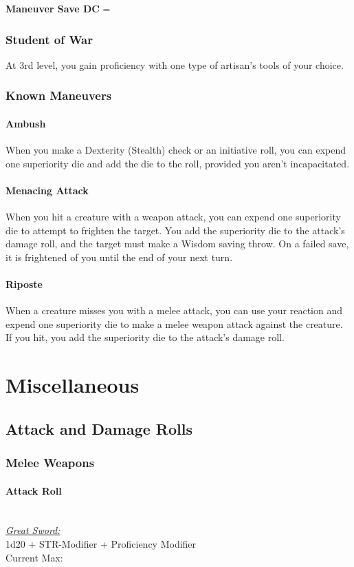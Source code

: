{\textbf{Maneuver Save DC} = 
\subsubsection*{Student of War}
At 3rd level, you gain proficiency with one type of artisan's tools of your choice.
\subsubsection*{Known Maneuvers}
\paragraph*{Ambush}
When you make a Dexterity (Stealth) check or an initiative roll, you can expend one superiority die and add the die to the roll, provided you aren't incapacitated.
\paragraph*{Menacing Attack}
When you hit a creature with a weapon attack, you can expend one superiority die to attempt to frighten the target. You add the superiority die to the attack's damage roll, and the target must make a Wisdom saving throw. On a failed save, it is frightened of you until the end of your next turn.
\paragraph*{Riposte}
When a creature misses you with a melee attack, you can use your reaction and expend one superiority die to make a melee weapon attack against the creature. If you hit, you add the superiority die to the attack's damage roll.

\vfill\eject
\section*{Miscellaneous}
\subsection*{Attack and Damage Rolls}
\subsubsection*{Melee Weapons}
\paragraph*{Attack Roll}\hfill\\
\underline{\textit{Great Sword:}}\\
1d20 + STR-Modifier + Proficiency Modifier\\
\indent Current Max: 
}
